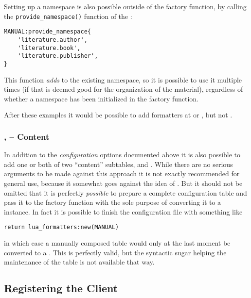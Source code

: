 \documentclass[12pt]{scrartcl}
\begin{document}
\noindent Setting up a namespace is also possible outside of the factory function, by calling the \texttt{provide_namespace()} function of the :

\begin{verbatim}
MANUAL:provide_namespace{
	'literature.author',
	'literature.book',
	'literature.publisher',
}
\end{verbatim}

\noindent This function \emph{adds} to the existing namespace, so it is possible
to use it multiple times (if that is deemed good for the organization of the
material), regardless of whether a namespace has been initialized in the factory
function.

After these examples it would be possible to add formatters at
 or , but not
.

\subsubsection[Content]{,  -- Content}

In addition to the \emph{configuration} options documented above it is also
possible to add one or both of two “content” subtables,  and
.  While there are no serious arguments to be made against
this approach it is not exactly recommended for general use, because it somewhat
goes against the idea of \luaformatters. But it should not be omitted
that it is perfectly \emph{possible} to prepare a complete configuration table
and pass it to the factory function with the sole purpose of converting it to a
 instance. In fact it is possible to finish the
configuration file with something like

\begin{verbatim}
return lua_formatters:new(MANUAL)
\end{verbatim}

\noindent in which case a manually composed table  would only at
the last moment be converted to a .  This is perfectly
valid, but the syntactic sugar helping the maintenance of the table is not
available that way.


\subsection{Registering the Client}
\label{sec:usage-registering-the-client}
\end{document}
